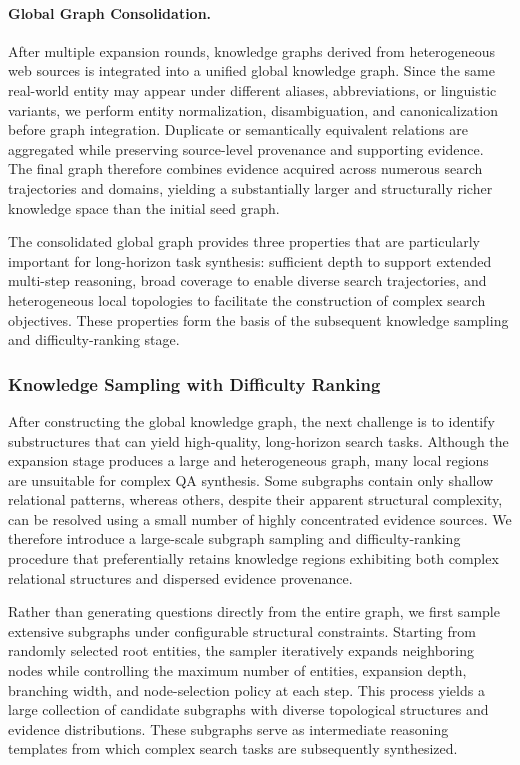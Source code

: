 \documentclass{huawei}
\begin{document}
\paragraph{Global Graph Consolidation.} After multiple expansion rounds, knowledge graphs derived from heterogeneous web sources is integrated into a unified global knowledge graph. Since the same real-world entity may appear under different aliases, abbreviations, or linguistic variants, we perform entity normalization, disambiguation, and canonicalization before graph integration. Duplicate or semantically equivalent relations are aggregated while preserving source-level provenance and supporting evidence. The final graph therefore combines evidence acquired across numerous search trajectories and domains, yielding a substantially larger and structurally richer knowledge space than the initial seed graph.


The consolidated global graph provides three properties that are particularly important for long-horizon task synthesis: sufficient depth to support extended multi-step reasoning, broad coverage to enable diverse search trajectories, and heterogeneous local topologies to facilitate the construction of complex search objectives. These properties form the basis of the subsequent knowledge sampling and difficulty-ranking stage.



\subsubsection{Knowledge Sampling with Difficulty Ranking}
After constructing the global knowledge graph, the next challenge is to identify substructures that can yield high-quality, long-horizon search tasks. Although the expansion stage produces a large and heterogeneous graph, many local regions are unsuitable for complex QA synthesis. Some subgraphs contain only shallow relational patterns, whereas others, despite their apparent structural complexity, can be resolved using a small number of highly concentrated evidence sources. We therefore introduce a large-scale subgraph sampling and difficulty-ranking procedure that preferentially retains knowledge regions exhibiting both complex relational structures and dispersed evidence provenance.


Rather than generating questions directly from the entire graph, we first sample extensive subgraphs under configurable structural constraints. Starting from randomly selected root entities, the sampler iteratively expands neighboring nodes while controlling the maximum number of entities, expansion depth, branching width, and node-selection policy at each step. This process yields a large collection of candidate subgraphs with diverse topological structures and evidence distributions. These subgraphs serve as intermediate reasoning templates from which complex search tasks are subsequently synthesized.
\end{document}

